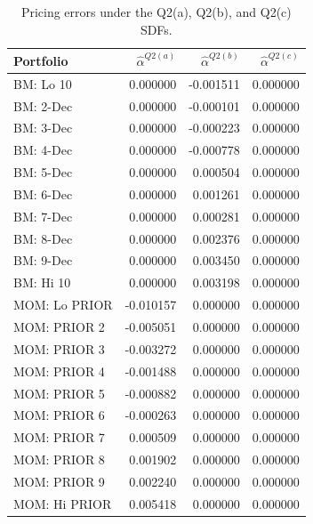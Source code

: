 \begin{table}[htbp]
\centering
\caption{Pricing errors under the Q2(a), Q2(b), and Q2(c) SDFs.}
\label{tab:q2d-pricing-errors}
\begin{tabular}{lrrr}
\hline
Portfolio & $\widehat{\alpha}^{Q2(a)}$ & $\widehat{\alpha}^{Q2(b)}$ & $\widehat{\alpha}^{Q2(c)}$ \\
\hline
BM: Lo 10 & 0.000000 & -0.001511 & 0.000000 \\
BM: 2-Dec & 0.000000 & -0.000101 & 0.000000 \\
BM: 3-Dec & 0.000000 & -0.000223 & 0.000000 \\
BM: 4-Dec & 0.000000 & -0.000778 & 0.000000 \\
BM: 5-Dec & 0.000000 & 0.000504 & 0.000000 \\
BM: 6-Dec & 0.000000 & 0.001261 & 0.000000 \\
BM: 7-Dec & 0.000000 & 0.000281 & 0.000000 \\
BM: 8-Dec & 0.000000 & 0.002376 & 0.000000 \\
BM: 9-Dec & 0.000000 & 0.003450 & 0.000000 \\
BM: Hi 10 & 0.000000 & 0.003198 & 0.000000 \\
MOM: Lo PRIOR & -0.010157 & 0.000000 & 0.000000 \\
MOM: PRIOR 2 & -0.005051 & 0.000000 & 0.000000 \\
MOM: PRIOR 3 & -0.003272 & 0.000000 & 0.000000 \\
MOM: PRIOR 4 & -0.001488 & 0.000000 & 0.000000 \\
MOM: PRIOR 5 & -0.000882 & 0.000000 & 0.000000 \\
MOM: PRIOR 6 & -0.000263 & 0.000000 & 0.000000 \\
MOM: PRIOR 7 & 0.000509 & 0.000000 & 0.000000 \\
MOM: PRIOR 8 & 0.001902 & 0.000000 & 0.000000 \\
MOM: PRIOR 9 & 0.002240 & 0.000000 & 0.000000 \\
MOM: Hi PRIOR & 0.005418 & 0.000000 & 0.000000 \\
\hline
\end{tabular}
\end{table}
